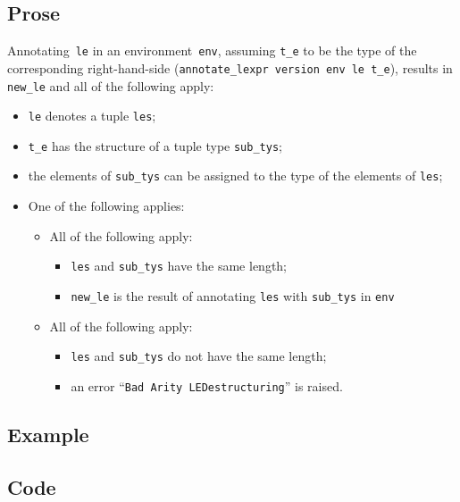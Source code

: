 \documentclass{book}
\begin{document}
  \subsection{Prose}
   Annotating~\texttt{le} in an environment~\texttt{env}, assuming
\texttt{t\_e} to be the type of the corresponding right-hand-side
(\texttt{annotate\_lexpr version env le t\_e}), results in \texttt{new\_le} and
all of the following apply:
   \begin{itemize}
   \item \texttt{le} denotes a tuple \texttt{les};
   \item \texttt{t\_e} has the structure of a tuple type \texttt{sub\_tys};
   \item the elements of \texttt{sub\_tys} can be assigned to the type of the elements of \texttt{les};
   \item One of the following applies:
     \begin{itemize}
     \item All of the following apply:
       \begin{itemize}
       \item \texttt{les} and \texttt{sub\_tys} have the same length;
       \item \texttt{new\_le} is the result of annotating \texttt{les} with \texttt{sub\_tys} in \texttt{env}
       \end{itemize}
     \item All of the following apply:
       \begin{itemize}
       \item \texttt{les} and \texttt{sub\_tys} do not have the same length;
       \item an error ``\texttt{Bad Arity LEDestructuring}'' is raised.
       \end{itemize}
     \end{itemize}
   \end{itemize}

  \subsection{Example}

  \subsection{Code}
\end{document}

